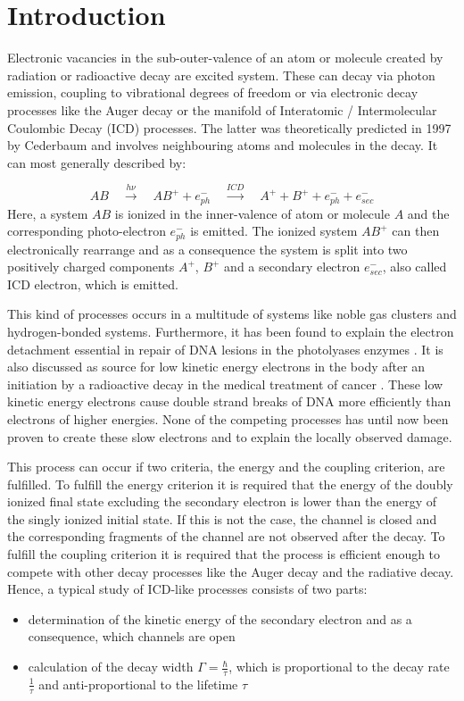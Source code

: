 \chapter{Introduction}
Electronic vacancies in the sub-outer-valence of an atom or molecule
created by radiation or radioactive decay are excited system.
These can decay via photon emission, coupling to vibrational degrees
of freedom or via electronic decay processes like the Auger
decay \cite{Meitner22,Auger23} or the
manifold of Interatomic / Intermolecular Coulombic Decay (ICD) processes.
The latter was theoretically predicted in 1997 by Cederbaum and involves
neighbouring atoms and molecules in the decay.
It can most generally described by:

\begin{equation*}
 AB \quad \xrightarrow{h\nu}\quad AB^+ + e^-_{ph} \quad
    \xrightarrow{ICD} \quad A^+ + B^+ + e^-_{ph} + e^-_{sec}
\end{equation*}
Here, a system $AB$ is ionized in the inner-valence of atom or molecule $A$
and the corresponding
photo-electron $e^-_{ph}$ is emitted. The ionized system $AB^+$
can then electronically
rearrange and as a consequence the system is split into two positively
charged components $A^+$, $B^+$ and a secondary electron $e^-_{sec}$,
also called ICD electron, which is emitted.

This kind of processes occurs in a multitude of systems like noble gas clusters
and hydrogen-bonded systems. Furthermore, it has been found to explain
the electron detachment essential in repair of DNA lesions in the
photolyases enzymes \cite{Harbach13}. It is also discussed as
source for low kinetic energy electrons in the body after an initiation
by a radioactive decay in the medical treatment of cancer
\cite{Kim11, Hergenhahn12, Boudaiffa00, Pan03, Martin04}. These low kinetic
energy electrons cause
double strand breaks of DNA more efficiently than electrons of higher energies.
None of the competing processes has until now been proven to create these slow
electrons and to explain the locally observed damage.

This process can occur if
two criteria, the energy and the coupling criterion,
are fulfilled. To fulfill the energy criterion it is required
that the energy of the doubly ionized final state excluding the secondary
electron is lower than
the energy of the singly ionized initial state. If this is not the case, the
channel is closed and the corresponding fragments of the
channel are not observed after the decay.
To fulfill the coupling criterion it is required that the process
is efficient enough to compete
with other decay processes like the Auger decay
and the radiative decay.
Hence, a typical study of \ac{ICD}-like processes consists of two parts:
\begin{itemize}
 \item determination of the kinetic energy of the secondary electron
       and as a consequence, which channels are open
 \item calculation of the decay width $\Gamma=\frac{\hbar}{\tau}$, which
       is proportional to the decay rate $\frac{1}{\tau}$ and
       anti-proportional to the lifetime $\tau$
\end{itemize}

